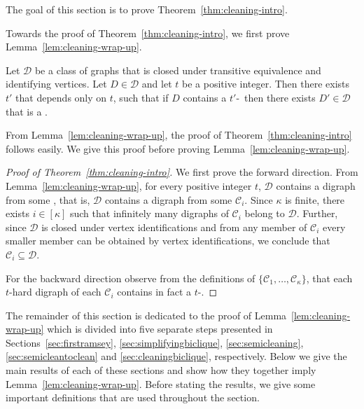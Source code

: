 The goal of this section is to prove Theorem~\ref{thm:cleaning-intro}.

\cleaning*

Towards the proof of Theorem~\ref{thm:cleaning-intro}, we first prove Lemma~\ref{lem:cleaning-wrap-up}. 

\begin{lemma}\label{lem:cleaning-wrap-up}
Let $\mathcal{D}$ be a class of graphs that is closed under transitive equivalence and identifying vertices. Let $D \in \mathcal{D}$ and let $t$ be a positive integer. 
Then there exists $t'$ that depends only on $t$,
such that if $D$ contains a $t'$-\toughpair\ then there exists $D' \in \mathcal{D}$ that is a .
\end{lemma}

From Lemma~\ref{lem:cleaning-wrap-up}, the proof of Theorem~\ref{thm:cleaning-intro} follows easily. We give this proof before proving Lemma~\ref{lem:cleaning-wrap-up}.

\begin{proof}[Proof of Theorem~\ref{thm:cleaning-intro}]

We first prove the forward direction.
From Lemma~\ref{lem:cleaning-wrap-up}, for every positive integer $t$, $\mathcal{D}$ contains a digraph from some , that is, $\mathcal{D}$ contains a digraph from some $\mathcal{C}_i$. Since $\kappa$ is finite, 
there exists $i \in [\kappa]$ such that infinitely many 
digraphs of $\mathcal{C}_i$ belong to $\mathcal{D}$. Further, since $\mathcal{D}$ is closed under vertex identifications and from any member of $\mathcal{C}_i$ every smaller member can be obtained by vertex identifications, we conclude that $\mathcal{C}_i \subseteq \mathcal{D}$.

For the backward direction observe from the definitions of $\{ \mathcal{C}_1, \ldots ,\mathcal{C}_{\kappa}\}$, that each $t$-hard digraph of each $\mathcal{C}_i$ contains in fact a $t$-\toughpair.
\end{proof}

The remainder of this section is dedicated to the proof of Lemma~\ref{lem:cleaning-wrap-up} which is divided into five separate steps presented in Sections~\ref{sec:firstramsey}, \ref{sec:simplifyingbiclique}, \ref{sec:semicleaning}, \ref{sec:semicleantoclean} and \ref{sec:cleaningbiclique}, respectively. Below we give the main results of each of these sections and show how they together imply Lemma~\ref{lem:cleaning-wrap-up}. Before stating the results, we give some important definitions that are used throughout the section.

